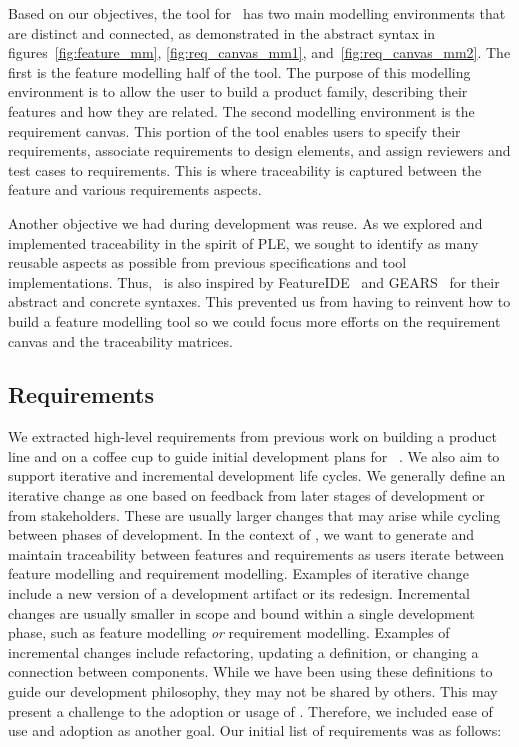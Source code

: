 Based on our objectives, the tool for \tool\ has two main modelling environments that are distinct and connected, as demonstrated in the abstract syntax in figures~\ref{fig:feature_mm}, \ref{fig:req_canvas_mm1}, and~\ref{fig:req_canvas_mm2}. The first is the feature modelling half of the tool. The purpose of this modelling environment is to allow the user to build a product family, describing their features and how they are related. The second modelling environment is the requirement canvas. This portion of the tool enables users to specify their requirements, associate requirements to design elements, and assign reviewers and test cases to requirements. This is where traceability is captured between the feature and various requirements aspects. 

Another objective we had during development was reuse. As we explored and implemented traceability in the spirit of \gls{PLE}, we sought to identify as many reusable aspects as possible from previous specifications and tool implementations. Thus, \tool\ is also inspired by FeatureIDE~\cite{kastner2009featureide, thum2014featureide} and GEARS~\cite{GEARS} for their abstract and concrete syntaxes. This prevented us from having to reinvent how to build a feature modelling tool so we could focus more efforts on the requirement canvas and the traceability matrices.

\subsection{Requirements}
We extracted high-level requirements from previous work on building a product line and on a coffee cup to guide initial development plans for \tool~\cite{10.1145/3652620.3688349}. We also aim to support iterative and incremental development life cycles. We generally define an iterative change as one based on feedback from later stages of development or from stakeholders. These are usually larger changes that may arise while cycling between phases of development. In the context of \tool, we want to generate and maintain traceability between features and requirements as users iterate between feature modelling and requirement modelling. Examples of iterative change include a new version of a development artifact or its redesign. Incremental changes are usually smaller in scope and bound within a single development phase, such as feature modelling \textit{or} requirement modelling. Examples of incremental changes include refactoring, updating a definition, or changing a connection between components. While we have been using these definitions to guide our development philosophy, they may not be shared by others. This may present a challenge to the adoption or usage of \tool. Therefore, we included ease of use and adoption as another goal. Our initial list of requirements was as follows:

